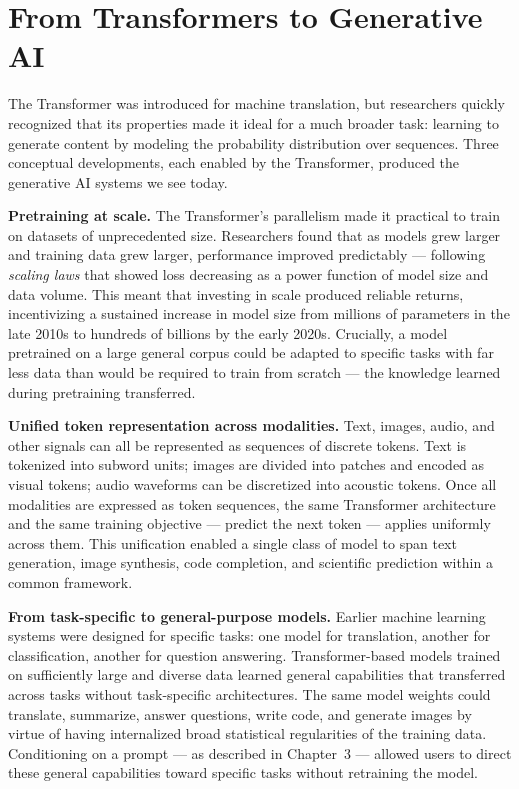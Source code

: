 \documentclass{book}
\begin{document}
\section{From Transformers to Generative AI}
\label{sec:transformers_to_genai}

The Transformer was introduced for machine translation, but researchers
quickly recognized that its properties made it ideal for a much broader
task: learning to generate content by modeling the probability distribution
over sequences. Three conceptual developments, each enabled by the
Transformer, produced the generative AI systems we see today.

\textbf{Pretraining at scale.} The Transformer's parallelism made it
practical to train on datasets of unprecedented size. Researchers found
that as models grew larger and training data grew larger, performance
improved predictably --- following \emph{scaling laws} that showed loss
decreasing as a power function of model size and data volume. This meant
that investing in scale produced reliable returns, incentivizing a
sustained increase in model size from millions of parameters in the late
2010s to hundreds of billions by the early 2020s. Crucially, a model
pretrained on a large general corpus could be adapted to specific tasks
with far less data than would be required to train from scratch --- the
knowledge learned during pretraining transferred.

\textbf{Unified token representation across modalities.} Text, images,
audio, and other signals can all be represented as sequences of discrete
tokens. Text is tokenized into subword units; images are divided into
patches and encoded as visual tokens; audio waveforms can be discretized
into acoustic tokens. Once all modalities are expressed as token sequences,
the same Transformer architecture and the same training objective ---
predict the next token --- applies uniformly across them. This unification
enabled a single class of model to span text generation, image synthesis,
code completion, and scientific prediction within a common framework.

\textbf{From task-specific to general-purpose models.} Earlier machine
learning systems were designed for specific tasks: one model for translation,
another for classification, another for question answering. Transformer-based
models trained on sufficiently large and diverse data learned general
capabilities that transferred across tasks without task-specific
architectures. The same model weights could translate, summarize,
answer questions, write code, and generate images by virtue of having
internalized broad statistical regularities of the training data.
Conditioning on a prompt --- as described in Chapter~3 --- allowed users
to direct these general capabilities toward specific tasks without
retraining the model.
\end{document}

